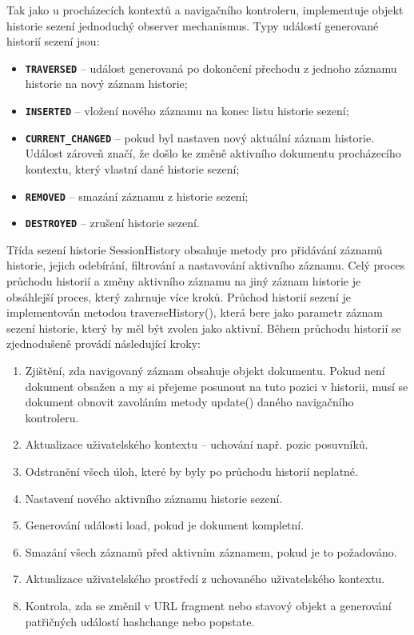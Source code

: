 Tak jako u procházecích kontextů a navigačního kontroleru, implementuje objekt historie sezení jednoduchý observer mechanismus. Typy událostí generované historií sezení jsou:

\begin{itemize}
  \item \textbf{\texttt{TRAVERSED}} -- událost generovaná po dokončení přechodu z jednoho záznamu historie na nový záznam historie;
  \item \textbf{\texttt{INSERTED}} -- vložení nového záznamu na konec listu historie sezení;
  \item \textbf{\texttt{CURRENT\_CHANGED}} -- pokud byl nastaven nový aktuální záznam historie. Událost zároveň značí, že došlo ke změně aktivního dokumentu procházecího kontextu, který vlastní dané historie sezení; 
  \item \textbf{\texttt{REMOVED}} -- smazání záznamu z historie sezení;
  \item \textbf{\texttt{DESTROYED}} -- zrušení historie sezení.
\end{itemize}

Třída sezení historie SessionHistory obsahuje metody pro přidávání záznamů historie, jejich odebírání, filtrování a nastavování aktivního záznamu. Celý proces průchodu historií a změny aktivního záznamu na jiný záznam historie je obsáhlejší proces, který zahrnuje více kroků. Průchod historií sezení je implementován metodou traverseHistory(), která bere jako parametr záznam sezení historie, který by měl být zvolen jako aktivní. Během průchodu historií se zjednodušeně provádí následující kroky:

\begin{enumerate}
  \item Zjištění, zda navigovaný záznam obsahuje objekt dokumentu. Pokud není dokument obsažen a my si přejeme posunout na tuto pozici v historii, musí se dokument obnovit zavoláním metody update() daného navigačního kontroleru.
  \item Aktualizace uživatelského kontextu – uchování např. pozic posuvníků.
  \item Odstranění všech úloh, které by byly po průchodu historií neplatné.
  \item Nastavení nového aktivního záznamu historie sezení.
  \item Generování události load, pokud je dokument kompletní.
  \item Smazání všech záznamů před aktivním záznamem, pokud je to požadováno.
  \item Aktualizace uživatelského prostředí z uchovaného uživatelského kontextu.
  \item Kontrola, zda se změnil v URL fragment nebo stavový objekt a generování patřičných událostí hashchange nebo popstate.
\end{enumerate}

